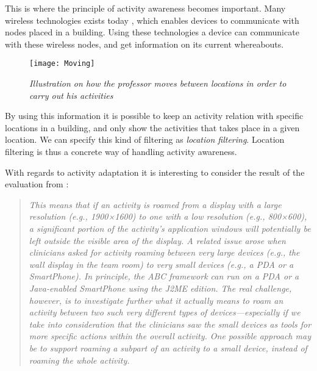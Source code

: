 This is where the principle of activity awareness becomes important. Many wireless technologies exists today \citep{wirelessWiki}, which enables devices to communicate with nodes placed in a building. Using these technologies a device can communicate with these wireless nodes, and get information on its current whereabouts.

\begin{figure}[h!]
  \centering
    \texttt{[image: Moving]}
  \caption{\emph{Illustration on how the professor moves between locations in order to carry out his activities}}
  \label{fig:locationmovement}
\end{figure}

By using this information it is possible to keep an activity relation with specific locations in a building, and only show the activities that takes place in a given location. We can specify this kind of filtering as \emph{location filtering}. Location filtering is thus a concrete way of handling activity awareness.

With regards to activity adaptation it is interesting to consider the result of the evaluation from \citet{bardram2009}:
\begin{quotation}
	\emph{
		This means that if an activity is roamed from a display with a large resolution (e.g., 1900×1600) to one with a low resolution (e.g., 800×600), a significant portion of the activity’s application windows will potentially be left outside the visible area of the display. A related issue arose when clinicians asked for activity roaming between very large devices (e.g., the wall display in the team room) to very small devices (e.g., a PDA or a SmartPhone). In principle, the ABC framework can run on a PDA or a Java-enabled SmartPhone using the J2ME edition. The real challenge, however, is to investigate further what it actually means to roam an activity between two such very different types of devices—especially if we take into consideration that the clinicians saw the small devices as tools for more specific actions within the overall activity. One possible approach may be to support roaming a subpart of an activity to a small device, instead of roaming the whole activity.
	}
\end{quotation}


